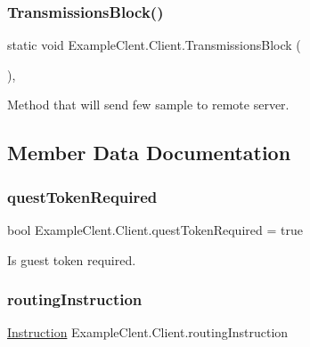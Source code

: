 \subsubsection{\texorpdfstring{Transmissions\+Block()}{TransmissionsBlock()}}
{\footnotesize\ttfamily static void Example\+Clent.\+Client.\+Transmissions\+Block (\begin{DoxyParamCaption}{ }\end{DoxyParamCaption})\hspace{0.3cm}{\ttfamily [static]}, {\ttfamily [private]}}



Method that will send few sample to remote server. 



\subsection{Member Data Documentation}
\mbox{\label{class_example_clent_1_1_client_ab504450de6cc737767a77f8f206a8d6f}} 
\subsubsection{\texorpdfstring{quest\+Token\+Required}{questTokenRequired}}
{\footnotesize\ttfamily bool Example\+Clent.\+Client.\+quest\+Token\+Required = true\hspace{0.3cm}{\ttfamily [static]}}



Is guest token required. 

\mbox{\label{class_example_clent_1_1_client_aa0a70a66b460286c18cbb59d4798f8f3}} 
\subsubsection{\texorpdfstring{routing\+Instruction}{routingInstruction}}
{\footnotesize\ttfamily \mbox{\hyperlink{class_pipes_provider_1_1_networking_1_1_routing_1_1_instruction}{Instruction}} Example\+Clent.\+Client.\+routing\+Instruction\hspace{0.3cm}{\ttfamily [static]}}



